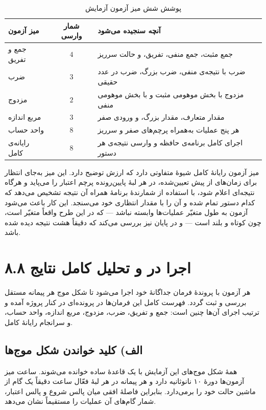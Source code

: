 \documentclass[12pt,a4paper]{article}
\begin{document}
	\begin{table}[H]
		\centering
		\footnotesize
		\begin{tabular}{|l|c|l|}
			\hline
			\textbf{میز آزمون} & \textbf{شمار وارسی} & \textbf{آنچه سنجیده می‌شود} \\ \hline
			جمع و تفریق & \(4\) & جمع مثبت، جمع منفی، تفریق، و حالت سرریز \\ \hline
			ضرب        & \(3\) & ضرب با نتیجه‌ی منفی، ضرب بزرگ، ضرب در عدد حقیقی \\ \hline
			مزدوج      & \(2\) & مزدوج با بخش موهومی مثبت و با بخش موهومی منفی \\ \hline
			مربع اندازه & \(3\) & مقدار متعارف، مقدار بزرگ، و ورودی صفر \\ \hline
			واحد حساب   & \(8\) & هر پنج عملیات به‌همراه پرچم‌های صفر و سرریز \\ \hline
			رایانه‌ی کامل & \(8\) & اجرای کامل برنامه‌ی حافظه و وارسی نتیجه‌ی هر دستور \\ \hline
		\end{tabular}
		\caption{پوشش شش میز آزمون آزمایش}
	\end{table}

	میز آزمون رایانهٔ کامل شیوهٔ متفاوتی دارد که ارزش توضیح دارد. این میز به‌جای انتظار برای زمان‌های از پیش تعیین‌شده، در هر لبهٔ پایین‌رونده پرچم اعتبار را می‌پاید و هرگاه نتیجه‌ای اعلام شود، با استفاده از شمارندهٔ برنامهٔ همراه آن نتیجه تشخیص می‌دهد که کدام دستور تمام شده و آن را با مقدار انتظاری خود می‌سنجد. این کار باعث می‌شود آزمون به طول متغیّر عملیات‌ها وابسته نباشد --- که در این طرح واقعاً متغیّر است، چون  کوتاه و  بلند است --- و در پایان نیز بررسی می‌کند که دقیقاً هشت نتیجه دیده شده باشد.


	\section*{۸.۸ اجرا در  و تحلیل کامل نتایج}
	هر آزمون با پروندهٔ فرمان جداگانهٔ خود اجرا می‌شود تا شکل موج هر پیمانه مستقل بررسی و ثبت گردد. فهرست کامل این فرمان‌ها در پرونده‌ای در کنار پروژه آمده و ترتیب اجرای آن‌ها چنین است: جمع و تفریق، ضرب، مزدوج، مربع اندازه، واحد حساب، و سرانجام رایانهٔ کامل.


	\subsection*{الف) کلید خواندن شکل موج‌ها}
	همهٔ شکل موج‌های این آزمایش با یک قاعدهٔ ساده خوانده می‌شوند. ساعت میز آزمون‌ها دورهٔ ۱۰ نانوثانیه دارد و هر پیمانه در هر لبهٔ فعّال ساعت دقیقاً یک گام از ماشین حالت خود را برمی‌دارد. بنابراین فاصلهٔ افقی میان پالس شروع و پالس اعتبار، شمار گام‌های آن عملیات را مستقیماً نشان می‌دهد.
\end{document}
